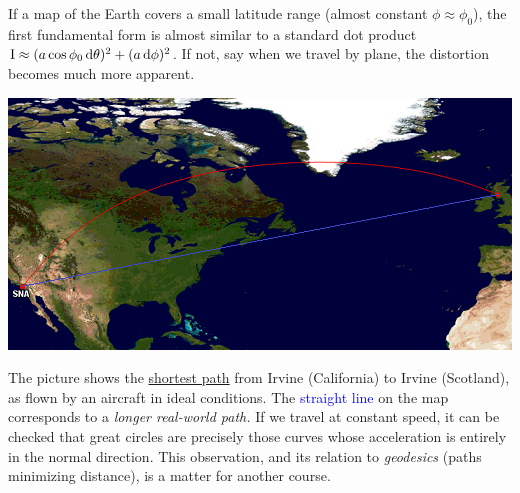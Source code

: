 \goodbreak


If a map of the Earth covers a small latitude range (almost constant $\phi\approx\phi_0$), the first fundamental form is almost similar to a standard dot product $\mathrm{I}\approx (a\cos\phi_0\,{\mathrm{d}\theta})^2+(a\,\mathrm{d}\phi)^2$. If not, say when we travel by plane, the distortion becomes much more apparent.
\begin{center}
	\includegraphics{fund-irvine.png}
\end{center}
The picture shows the \textcolor{red}{\href{http://www.gcmap.com/mapui?P=SNA-PIK}{shortest path}} from Irvine (California) to Irvine (Scotland), as flown by an aircraft in ideal conditions. The \textcolor{blue}{straight line} on the map corresponds to a \emph{longer real-world path.}\smallbreak
If we travel at constant speed, it can be checked that great circles are precisely those curves whose acceleration is entirely in the normal direction. This observation, and its relation to \emph{geodesics} (paths minimizing distance), is a matter for another course.


